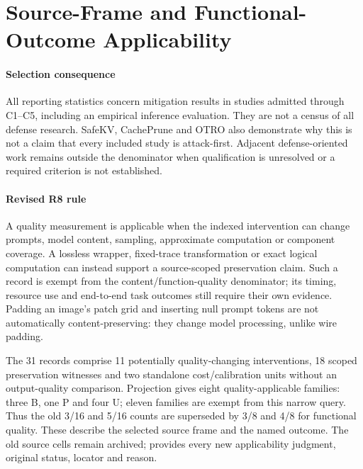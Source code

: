 \section{Source-Frame and Functional-Outcome Applicability}\label{sec:r41-utility}
\paragraph{Selection consequence} All reporting statistics concern mitigation results in studies admitted through C1--C5, including an empirical inference evaluation. They are not a census of all defense research. SafeKV, CachePrune and OTRO also demonstrate why this is not a claim that every included study is attack-first. Adjacent defense-oriented work remains outside the denominator when qualification is unresolved or a required criterion is not established.

\paragraph{Revised R8 rule} A quality measurement is applicable when the indexed intervention can change prompts, model content, sampling, approximate computation or component coverage. A lossless wrapper, fixed-trace transformation or exact logical computation can instead support a source-scoped preservation claim. Such a record is exempt from the content/function-quality denominator; its timing, resource use and end-to-end task outcomes still require their own evidence. Padding an image's patch grid and inserting null prompt tokens are not automatically content-preserving: they change model processing, unlike wire padding.

The 31 records comprise 11 potentially quality-changing interventions, 18 scoped preservation witnesses and two standalone cost/calibration units without an output-quality comparison. Projection gives eight quality-applicable families: three B, one P and four U; eleven families are exempt from this narrow query. Thus the old 3/16 and 5/16 counts are superseded by 3/8 and 4/8 for functional quality. These describe the selected source frame and the named outcome. The old source cells remain archived;  provides every new applicability judgment, original status, locator and reason.

